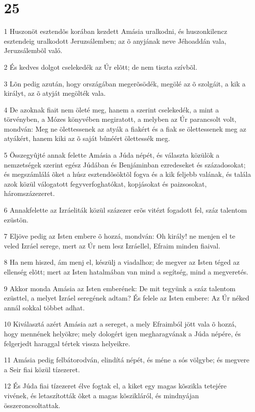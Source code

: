 \chapter{25}

\par 1 Huszonöt esztendõs korában kezdett Amásia uralkodni, és huszonkilencz esztendeig uralkodott Jeruzsálemben; az õ anyjának neve Jéhoaddán vala, Jeruzsálembõl való.
\par 2 És kedves dolgot cselekedék az Úr elõtt; de nem tiszta szívbõl.
\par 3 Lõn pedig azután, hogy országában megerõsödék, megölé az õ szolgáit, a kik a királyt, az õ atyját megölték vala.
\par 4 De azoknak fiait nem öleté meg, hanem a szerint cselekedék, a mint a törvényben, a Mózes könyvében megiratott, a melyben az Úr parancsolt volt, mondván: Meg ne ölettessenek az atyák a fiakért és a fiak se ölettessenek meg az atyákért, hanem kiki az õ saját bûnéért ölettessék meg.
\par 5 Összegyûjté annak felette Amásia a Júda népét, és választa közülök a nemzetségek szerint egész Júdában és Benjáminban ezredeseket és századosokat; és megszámlálá õket a húsz esztendõsöktõl fogva és a kik feljebb valának, és talála azok közül válogatott fegyverfoghatókat, kopjásokat és paizsosokat, háromszázezeret.
\par 6 Annakfelette az Izráeliták közül százezer erõs vitézt fogadott fel, száz talentom ezüstön.
\par 7 Eljöve pedig az Isten embere õ hozzá, mondván: Oh király! ne menjen el te veled Izráel serege, mert az Úr nem lesz Izráellel, Efraim minden fiaival.
\par 8 Ha nem hiszed, ám menj el, készülj a viadalhoz; de megver az Isten téged az ellenség elõtt; mert az Isten hatalmában van mind a segítség, mind a megveretés.
\par 9 Akkor monda Amásia az Isten emberének: De mit tegyünk a száz talentom ezüsttel, a melyet Izráel seregének adtam? És felele az Isten embere: Az Úr néked annál sokkal többet adhat.
\par 10 Kiválasztá azért Amásia azt a sereget, a mely Efraimból jött vala õ hozzá, hogy mennének helyökre; mely dologért igen megharagvának a Júda népére, és felgerjedt haraggal tértek vissza helyeikre.
\par 11 Amásia pedig felbátorodván, elindítá népét, és méne a sós völgybe; és megvere a Seir fiai közül tízezeret.
\par 12 És Júda fiai tízezeret élve fogtak el, a kiket egy magas kõszikla tetejére vivének, és letaszították õket a magas kõszikláról, és mindnyájan összeroncsoltattak.
